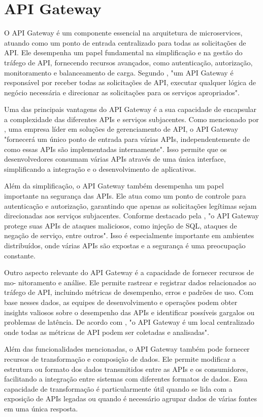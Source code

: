 \section{API Gateway}

O API Gateway é um componente essencial na arquitetura de microservices, atuando
como um ponto de entrada centralizado para todas as solicitações de API. Ele desempenha
um papel fundamental na simplificação e na gestão do tráfego de API, fornecendo recursos
avançados, como autenticação, autorização, monitoramento e balanceamento de carga. Segundo
\cite{w3c2023webapi}, "um API Gateway é responsável por receber todas as solicitações de API, executar
qualquer lógica de negócio necessária e direcionar as solicitações para os serviços apropriados".

Uma das principais vantagens do API Gateway é a sua capacidade de encapsular a
complexidade das diferentes APIs e serviços subjacentes. Como mencionado por \cite{Kong2023},
uma empresa líder em soluções de gerenciamento de API, o API Gateway "fornecerá um único
ponto de entrada para várias APIs, independentemente de como essas APIs são implementadas
internamente". Isso permite que os desenvolvedores consumam várias APIs através de uma única
interface, simplificando a integração e o desenvolvimento de aplicativos.

Além da simplificação, o API Gateway também desempenha um papel importante na
segurança das APIs. Ele atua como um ponto de controle para autenticação e autorização,
garantindo que apenas as solicitações legítimas sejam direcionadas aos serviços subjacentes.
Conforme destacado pela \cite{AWS2023}, "o API Gateway protege suas APIs de ataques maliciosos,
como injeção de SQL, ataques de negação de serviço, entre outros". Isso é especialmente
importante em ambientes distribuídos, onde várias APIs são expostas e a segurança é uma
preocupação constante.

Outro aspecto relevante do API Gateway é a capacidade de fornecer recursos de mo-
nitoramento e análise. Ele permite rastrear e registrar dados relacionados ao tráfego de API,
incluindo métricas de desempenho, erros e padrões de uso. Com base nesses dados, as equipes
de desenvolvimento e operações podem obter insights valiosos sobre o desempenho das APIs
e identificar possíveis gargalos ou problemas de latência. De acordo com \cite{APIS2023}, "o
API Gateway é um local centralizado onde todas as métricas de API podem ser coletadas e
analisadas".

Além das funcionalidades mencionadas, o API Gateway também pode fornecer recursos
de transformação e composição de dados. Ele permite modificar a estrutura ou formato dos
dados transmitidos entre as APIs e os consumidores, facilitando a integração entre sistemas com
diferentes formatos de dados. Essa capacidade de transformação é particularmente útil quando
se lida com a exposição de APIs legadas ou quando é necessário agrupar dados de várias fontes
em uma única resposta.

